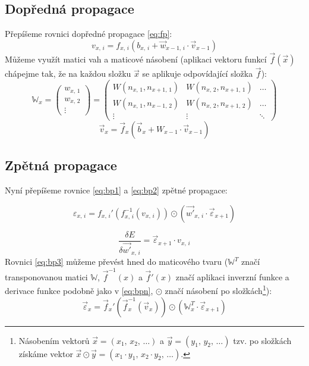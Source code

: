 \documentclass[12pt]{report}			%
\newcommand{\W}{\mathbb{W}}
\begin{document}
					\subsection{Dopředná propagace}
					Přepíšeme rovnici dopředné propagace \ref{eq:fp}:
					\begin{equation} v_{x,\,i} = f_{x,\,i}\left(b_{x,\,i} + \vec{w}_{x-1,\,i} \cdot \vec{v}_{x-1} \right) \end{equation}
					Můžeme využít matici vah a maticové násobení (aplikaci vektoru funkcí $\vec{f}(\vec{x})$ chápejme tak, že na každou složku $\vec{x}$ se aplikuje odpovídající složka $\vec{f}$):
					\begin{equation}
						\W_x = \begin{pmatrix}
							w_{x,\,1} \\
							w_{x,\,2} \\
							\vdots
						\end{pmatrix} = \begin{pmatrix}
							W\left(n_{x,\,1}, n_{x+1,\,1}\right) & W\left(n_{x,\,2}, n_{x+1,\,1}\right) & \ldots \\
							W\left(n_{x,\,1}, n_{x-1,\,2}\right) & W\left(n_{x,\,2}, n_{x+1,\,2}\right) & \ldots \\
							\vdots & \vdots & \ddots
						\end{pmatrix}
						\label{eq:wm}
					\end{equation}
					\begin{equation} \vec{v}_x = \vec{f}_x\left(\vec{b}_x + W_{x-1} \cdot \vec{v}_{x-1} \right) \label{eq:bpn} \end{equation}
					
					\subsection{Zpětná propagace}
					Nyní přepíšeme rovnice \ref{eq:bp1} a \ref{eq:bp2} zpětné propagace:
					
					\begin{equation} \varepsilon_{x,\,i} = f_{x,\,i}'\left(f_{x,\,i}^{-1}(v_{x,\,i})\right) \odot \left(\vec{w'}_{x,\,i} \cdot \vec{\varepsilon}_{x+1}\right) \label{eq:bp3} \end{equation}
					
					\begin{equation} \frac{\delta E}{\delta\vec{w'}_{x,\,i}} = \vec{\varepsilon}_{x+1}\cdot v_{x,\,i} \label{eq:bp4}\end{equation}
					Rovnici \ref{eq:bp3} můžeme převést hned do maticového tvaru ($\W^T$ značí transponovanou matici $\W$, $\vec{f}^{-1}(x)$ a $\vec{f}'(x)$ značí aplikaci inverzní funkce a derivace funkce podobně jako v \ref{eq:bpn}, $\odot$ značí násobení po složkách\footnote{Násobením vektorů $\vec{x} = \left(x_1,\,x_2,\,\ldots\right)$ a $\vec{y} = \left(y_1,\,y_2,\,\ldots\right)$ tzv. po složkách získáme vektor $\vec{x}\odot\vec{y} = \left(x_1\cdot y_1,\,x_2 \cdot y_2,\,\ldots\right)$.}):
					\begin{equation} \vec{\varepsilon}_x = \vec{f}_x'\left(\vec{f}_x^{-1}(\vec{v}_x)\right) \odot \left(\W_x^T \cdot \vec{\varepsilon}_{x+1}\right)  \label{eq:bpab} \end{equation}
					
\end{document}
